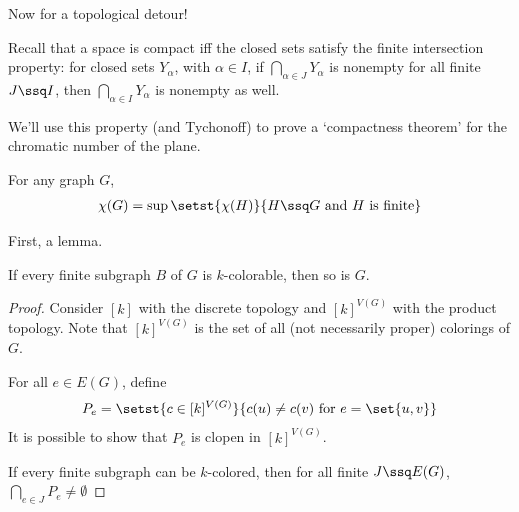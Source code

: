 Now for a topological detour!

Recall that a space is compact iff the closed sets satisfy the finite intersection property: for closed sets $Y_{\alpha}$, with $\alpha \in I$, if $\bigcap_{\alpha \in J} Y_{\alpha}$ is nonempty for all finite $J \ssq I$, then $\bigcap_{\alpha \in I} Y_{\alpha}$ is nonempty as well.

We'll use this property (and Tychonoff) to prove a `compactness theorem' for the chromatic number of the plane.

\begin{boxtheorem}
    For any graph $G$,
    \begin{align*}
        \chi(G) = \sup\setst{\chi(H)}{H \ssq G \text{ and } H \text{ is finite}}
    \end{align*}
\end{boxtheorem}

First, a lemma.

\begin{boxlemma} \label{Ch2:Lemma:Compactness}
    If every finite subgraph $B$ of $G$ is $k$-colorable, then so is $G$.
\end{boxlemma}
\begin{proof}
    Consider $[k]$ with the discrete topology and $[k]^{V(G)}$ with the product topology. Note that $[k]^{V(G)}$ is the set of all (not necessarily proper) colorings of $G$.

    For all $e \in E(G)$, define
    \begin{align*}
        P_e = \setst{c \in [k]^{V(G)}}{c(u) \ne c(v) \text{ for } e = \set{u, v}}
    \end{align*}
    It is possible to show that $P_e$ is clopen in $[k]^{V(G)}$.

    If every finite subgraph can be $k$-colored, then for all finite $J \ssq E(G)$, $\bigcap_{e \in J} P_{e} \ne \emptyset$ \sorry
\end{proof}

